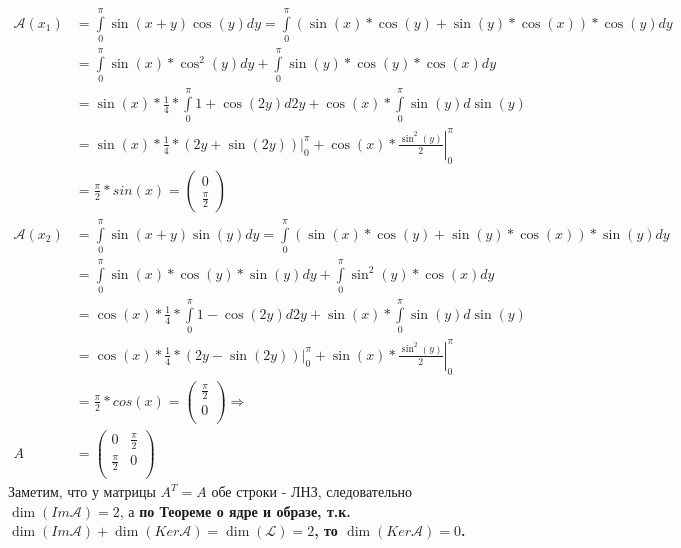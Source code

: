 \documentclass[12pt, a4paper]{article}
\begin{document}
\begin{equation*}
\begin{aligned}
\mathcal{A}(x_1) &= \int\limits_{0}^{\pi} \sin(x+y) \cos(y) dy = \int\limits_{0}^{\pi} \left(\sin(x)*\cos(y)+\sin(y)*\cos(x)\right)* \cos(y) dy\\
&= \int\limits_{0}^{\pi} \sin(x)*\cos^2(y) dy + \int\limits_{0}^{\pi} \sin(y)*\cos(y)* \cos(x) dy \\
&= \sin(x) * \frac{1}{4} * \int\limits_{0}^{\pi} 1 + \cos(2y) d2y + \cos(x) * \int\limits_{0}^{\pi} \sin(y) d\sin(y)\\
&= \sin(x) * \frac{1}{4} * \left.\left(2y + \sin(2y)\right)\right|_{0}^{\pi} + \left. \cos(x) * \frac{\sin^2(y)}{2}\right|_{0}^{\pi}\\
&= \frac{\pi}{2}*sin(x) = \begin{pmatrix}
0\\
\frac{\pi}{2}
\end{pmatrix}\\
\mathcal{A}(x_2) &= \int\limits_{0}^{\pi} \sin(x+y) \sin(y) dy = \int\limits_{0}^{\pi} \left(\sin(x)*\cos(y)+\sin(y)*\cos(x)\right)* \sin(y) dy\\
&= \int\limits_{0}^{\pi} \sin(x)*\cos(y)*\sin(y) dy + \int\limits_{0}^{\pi} \sin^2(y)*\cos(x) dy \\
&= \cos(x) * \frac{1}{4} * \int\limits_{0}^{\pi} 1 - \cos(2y) d2y + \sin(x) * \int\limits_{0}^{\pi} \sin(y) d\sin(y)\\
&= \cos(x) * \frac{1}{4} * \left.\left(2y - \sin(2y)\right)\right|_{0}^{\pi} + \left. \sin(x) * \frac{\sin^2(y)}{2}\right|_{0}^{\pi}\\
&= \frac{\pi}{2}*cos(x) = \begin{pmatrix}
\frac{\pi}{2}\\
0\\

\end{pmatrix} \Rightarrow\\
A &= \begin{pmatrix}
0 & \frac{\pi}{2}\\
\frac{\pi}{2} & 0\\
\end{pmatrix}
\end{aligned}
\end{equation*}
Заметим, что у матрицы $A^T=A$ обе строки - ЛНЗ, следовательно $\dim(Im\mathcal{A})=2$, а \textbf{по Теореме о ядре и образе, т.к. $\dim(Im\mathcal{A}) + \dim(Ker\mathcal{A})=\dim(\mathcal{L})=2$, то $\dim(Ker\mathcal{A})=0$. }
\end{document}
